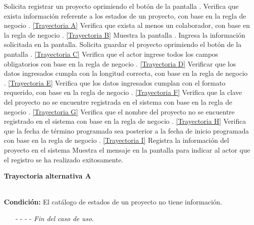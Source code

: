 	\begin{UCtrayectoria}
		\UCpaso[\UCactor] Solicita registrar un proyecto oprimiendo el botón  de la pantalla .
		\UCpaso[\UCsist] Verifica que exista información referente a los estados de un proyecto, con base en la regla de negocio . \hyperlink{CU2-1:TAA}{[Trayectoria A]}
		\UCpaso[\UCsist] Verifica que exista al menos un colaborador, con base en la regla de negocio . \hyperlink{CU2-1:TAB}{[Trayectoria B]}
		\UCpaso[\UCsist] Muestra la pantalla .
		\UCpaso[\UCactor] Ingresa la información solicitada en la pantalla. \label{CU2.1-P5}
		\UCpaso[\UCactor] Solicita guardar el proyecto oprimiendo el botón  de la pantalla . \hyperlink{CU2-1:TAC}{[Trayectoria C]}
		\UCpaso[\UCsist] Verifica que el actor ingrese todos los campos obligatorios con base en la regla de negocio . \hyperlink{CU2-1:TAD}{[Trayectoria D]}
		\UCpaso[\UCsist] Verificar que los datos ingresados cumpla con la longitud correcta, con base en la regla de negocio . \hyperlink{CU2-1:TAE}{[Trayectoria E]}
		\UCpaso[\UCsist] Verifica que los datos ingresados cumplan con el formato requerido, con base en la regla de negocio . \hyperlink{CU2-1:TAF}{[Trayectoria F]}
		\UCpaso[\UCsist] Verifica que la clave del proyecto no se encuentre registrada en el sistema con base en la regla de negocio . \hyperlink{CU2-1:TAG}{[Trayectoria G]}
		\UCpaso[\UCsist] Verifica que el nombre del proyecto no se encuentre registrado en el sistema con base en la regla de negocio . \hyperlink{CU2-1:TAH}{[Trayectoria H]}
		\UCpaso[\UCsist] Verifica que la fecha de término programada sea posterior a la fecha de inicio programada con base en la regla de negocio . \hyperlink{CU2-1:TAI}{[Trayectoria I]}
		\UCpaso[\UCsist] Registra la información del proyecto en el sistema
		\UCpaso[\UCsist] Muestra el mensaje  en la pantalla  para indicar al actor que el registro se ha realizado exitosamente.
	\end{UCtrayectoria}		
\hypertarget{CU2-1:TAA}{\textbf{Trayectoria alternativa A}}\\
\noindent \textbf{Condición:} El catálogo de estados de un proyecto no tiene información.
\begin{enumerate}
	\UCpaso[\UCsist] Muestra el mensaje  en la pantalla  para indicar que no es posible realizar la operación debido a la falta de información necesaria para el sistema.
	\item[- -] - - {\em {Fin del caso de uso}}.%
\end{enumerate}

